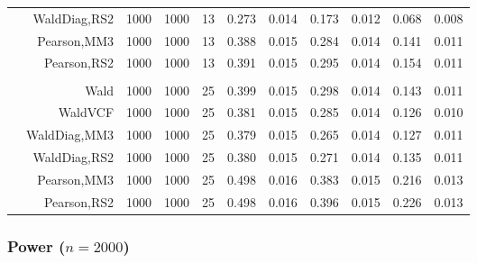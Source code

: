\documentclass[
]{article}
\begin{document}
\begin{table}[H]
{\begin{tabular}[t]{lrrrrrrrlrr}
\hspace{1em} & WaldDiag,RS2 & 1000 & 1000 & 13 & 0.273 & 0.014 & 0.173 & 0.012 & 0.068 & 0.008\\

\hspace{1em} & Pearson,MM3 & 1000 & 1000 & 13 & 0.388 & 0.015 & 0.284 & 0.014 & 0.141 & 0.011\\

\hspace{1em} & Pearson,RS2 & 1000 & 1000 & 13 & 0.391 & 0.015 & 0.295 & 0.014 & 0.154 & 0.011\\
\cmidrule{1-11}
\addlinespace[0.3em]
\multicolumn{11}{l}{\textbf{3F 15V}}\\
\hspace{1em} & Wald & 1000 & 1000 & 25 & 0.399 & 0.015 & 0.298 & 0.014 & 0.143 & 0.011\\

\hspace{1em} & WaldVCF & 1000 & 1000 & 25 & 0.381 & 0.015 & 0.285 & 0.014 & 0.126 & 0.010\\

\hspace{1em} & WaldDiag,MM3 & 1000 & 1000 & 25 & 0.379 & 0.015 & 0.265 & 0.014 & 0.127 & 0.011\\

\hspace{1em} & WaldDiag,RS2 & 1000 & 1000 & 25 & 0.380 & 0.015 & 0.271 & 0.014 & 0.135 & 0.011\\

\hspace{1em} & Pearson,MM3 & 1000 & 1000 & 25 & 0.498 & 0.016 & 0.383 & 0.015 & 0.216 & 0.013\\

\hspace{1em} & Pearson,RS2 & 1000 & 1000 & 25 & 0.498 & 0.016 & 0.396 & 0.015 & 0.226 & 0.013\\
\bottomrule
\end{tabular}}
\endgroup{}
\end{table}

\hypertarget{power-n2000}{%
\subsubsection{\texorpdfstring{Power
(\(n=2000\))}{Power (n=2000)}}\label{power-n2000}}
\end{document}
